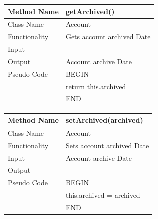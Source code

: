 \documentclass[12pt]{article}
\begin{document}
\begin{tabular}{ |p{3cm}||p{\colWidth}|  }
	\hline
	Method Name &  getArchived()\\
	\hline
	Class Name & Account\\
	\hline
	Functionality & Gets account archived Date\\
	\hline
	Input & -\\
	\hline
	Output & Account archive Date\\
	\hline
	Pseudo Code&BEGIN\\ & return this.archived\\&END\\
	\hline
\end{tabular}

\begin{tabular}{ |p{3cm}||p{\colWidth}|  }
	\hline
	Method Name &  setArchived(archived)\\
	\hline
	Class Name & Account\\
	\hline
	Functionality & Sets account archived Date\\
	\hline
	Input & Account archive Date\\
	\hline
	Output & -\\
	\hline
	Pseudo Code&BEGIN\\ & this.archived = archived\\&END\\
	\hline
\end{tabular}

\pagebreak
\end{document}
